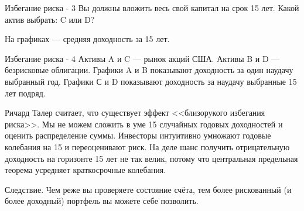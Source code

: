 \documentclass{beamer}
\begin{document}
\begin{frame}{Избегание риска - 3}
\justify
Вы должны вложить весь свой капитал на срок 15 лет. Какой актив выбрать: C или D?

\justify
\centering
{}

\justify
На графиках --- средняя доходность за 15 лет.
\end{frame}



\begin{frame}{Избегание риска - 4}
\justify
Активы A и C --- рынок акций США. Активы B и D --- безрисковые облигации. 
Графики A и B показывают доходность за один наудачу выбранный год. Графики С и 
D показывают доходность за наудачу выбранные 15 лет подряд.

\justify
Ричард Талер считает, что существует эффект <<близорукого избегания риска>>. Мы 
не можем сложить в уме 15 случайных годовых доходностей и оценить распределение 
суммы. Инвесторы интуитивно умножают годовые колебания на 15 и переоценивают 
риск. На деле шанс получить отрицательную доходность на горизонте 15 лет не так 
велик, потому что центральная предельная теорема усредняет краткосрочные 
колебания.

\justify
Следствие. Чем реже вы проверяете состояние счёта, тем более рискованный (и 
более доходный) портфель вы можете себе позволить.
\end{frame}
\end{document}
